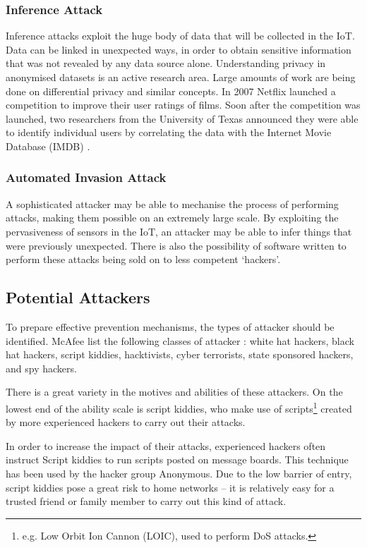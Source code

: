 \documentclass[10pt,journal,compsoc]{IEEEtran}
\begin{document}
\subsubsection{Inference Attack}
Inference attacks exploit the huge body of data that will be collected in the
IoT. Data can be linked in unexpected ways, in order to obtain sensitive
information that was not revealed by any data source alone. Understanding
privacy in anonymised datasets is an active research area. Large amounts of
work are being done on differential privacy and similar concepts. In 2007
Netflix launched a competition to improve their user ratings of films. Soon
after the competition was launched, two researchers from the University of
Texas announced they were able to identify individual users by correlating the
data with the Internet Movie Database (IMDB) \cite{Narayanan2008}.

\subsubsection{Automated Invasion Attack}
A sophisticated attacker may be able to mechanise the process of performing
attacks, making them possible on an extremely large scale. By exploiting the
pervasiveness of sensors in the IoT, an attacker may be able to infer things
that were previously unexpected. There is also the possibility of software
written to perform these attacks being sold on to less competent `hackers'. 

\subsection{Potential Attackers}
To prepare effective prevention mechanisms, the types of attacker should be
identified. McAfee list the following classes of attacker \cite{McAfee2011}:
white hat hackers, black hat hackers, script kiddies, hacktivists, cyber
terrorists, state sponsored hackers, and spy hackers. 

There is a great variety in the motives and abilities of these attackers. On
the lowest end of the ability scale is script kiddies, who make use of
scripts\footnote{e.g. Low Orbit Ion Cannon (LOIC), used to perform DoS
attacks.} created by more experienced hackers to carry out their attacks. 

In order to increase the impact of their attacks, experienced hackers often
instruct Script kiddies to run scripts posted on message boards. This
technique has been used by the hacker group Anonymous. Due to the low barrier
of entry, script kiddies pose a great risk to home networks -- it is
relatively easy for a trusted friend or family member to carry out this kind
of attack. 
\end{document}

